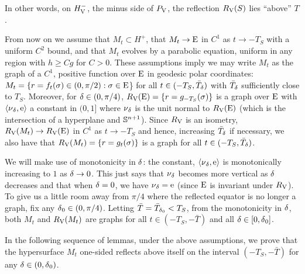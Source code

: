 \documentclass{amsart}
\begin{document}
In other words, on \(\reflectionhalfspace^-\), the minus side of \(\reflectionplane\), the reflection \(\reflectionmap(S)\) lies ``above'' \(T\).

From now on we assume that \(M_t \subset H^+\), that \(M_t \to \equator\) in \(C^1\) as \(t \to -T_S\) with a uniform \(C^2\) bound, and that \(M_t\) evolves by a parabolic equation, uniform in any region with \(h \geq C g\) for \(C>0\). These assumptions imply we may write \(M_t\) as the graph of a \(C^1\), positive function over \(\equator\) in geodesic polar coordinates: \(M_t = \{r = f_t(\sigma) \in (0,\pi/2) : \sigma \in \equator\)\} for all \(t \in (-T_S, \bar{T}_{\reflectionangle})\) with \(\bar{T}_{\reflectionangle}\) sufficiently close to \(T_S\). Moreover, for \(\reflectionangle \in (0,\pi/4)\), \(\reflectionmap(\equator) = \{r = g_{-T_S}(\sigma)\}\) is a graph over \(\equator\) with \(\ip{\nor_{\reflectionangle}}{\vertvec}\) a constant in \((0,1]\) where \(\nor_{\reflectionangle}\) is the unit normal to \(\reflectionmap(\equator)\) (which is the intersection of a hyperplane and \(\S^{n+1}\)). Since \(\reflectionmap\) is an isometry, \(\reflectionmap(M_t) \to \reflectionmap(\equator)\) in \(C^1\) as \(t \to -T_S\) and hence, increasing \(\bar{T}_{\reflectionangle}\) if necessary, we also have that \(\reflectionmap(M_t) = \{r = g_t(\sigma)\}\) is a graph for all \(t \in (-T_S, \bar{T}_{\reflectionangle})\).

We will make use of monotonicity in \(\reflectionangle\): the constant, \(\ip{\nor_{\reflectionangle}}{\vertvec}\) is monotonically increasing to \(1\) as \(\reflectionangle \to 0\). This just says that \(\nor_{\reflectionangle}\) becomes more vertical as \(\reflectionangle\) decreases and that when \(\reflectionangle = 0\), we have \(\nor_{\reflectionangle} = \vertvec\) (since \(\equator\) is invariant under \(\reflectionmap\)). To give us a little room away from \(\pi/4\) where the reflected equator is no longer a graph, fix any \(\reflectionangle_0 \in (0,\pi/4)\). Letting \(\bar{T} = \bar{T}_{\reflectionangle_0} < T_S\), from the monotonicity in \(\reflectionangle\), both \(M_t\) and \(\reflectionmap(M_t)\) are graphs for all \(t \in (-T_S, -\bar{T})\) and all \(\reflectionangle \in [0,\reflectionangle_0]\).

In the following sequence of lemmas, under the above assumptions, we prove that the hypersurface \(M_t\) one-sided reflects above itself on the interval \((-T_S, -\bar{T})\) for any \(\reflectionangle \in (0, \reflectionangle_0)\).
\end{document}
